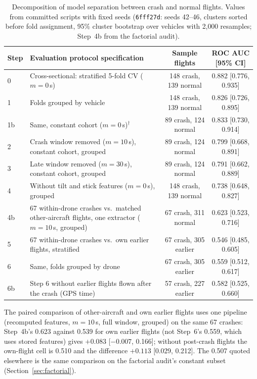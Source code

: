 \documentclass[preprint,12pt]{elsarticle}
\begin{document}
\begin{table}[t]
\centering
\caption{Decomposition of model separation between crash and normal flights. Values from committed scripts with fixed seeds (\texttt{6fff27d}: seeds 42--46, clusters sorted before fold assignment, 95\% cluster bootstrap over vehicles with 2,000 resamples; Step~4b from the factorial audit).}
\label{tab:decomposition}
\small
\begin{tabularx}{\textwidth}{@{}l X c c@{}}
\toprule
Step & Evaluation protocol specification & Sample flights & ROC AUC [95\% CI] \\
\midrule
0 & Cross-sectional: stratified 5-fold CV ($m=0$\,s) & 148 crash, 139 normal & 0.882 [0.776, 0.935] \\
1 & Folds grouped by vehicle & 148 crash, 139 normal & 0.826 [0.726, 0.895] \\
1b & Same, constant cohort ($m=0$\,s)$^\dagger$ & 89 crash, 124 normal & 0.833 [0.730, 0.914] \\
2 & Crash window removed ($m=10$\,s), constant cohort, grouped & 89 crash, 124 normal & 0.799 [0.668, 0.891] \\
3 & Late window removed ($m=30$\,s), constant cohort, grouped & 89 crash, 124 normal & 0.791 [0.662, 0.889] \\
4 & Without tilt and stick features ($m=0$\,s), grouped & 148 crash, 139 normal & 0.738 [0.648, 0.827] \\
4b & 67 within-drone crashes vs.\ matched other-aircraft flights, one extractor ($m=10$\,s, grouped) & 67 crash, 311 normal & 0.623 [0.523, 0.716] \\
5 & 67 within-drone crashes vs.\ own earlier flights, stratified & 67 crash, 305 earlier & 0.546 [0.485, 0.605] \\
6 & Same, folds grouped by drone & 67 crash, 305 earlier & 0.559 [0.512, 0.617] \\
6b & Step 6 without earlier flights flown after the crash (GPS time) & 57 crash, 227 earlier & 0.582 [0.525, 0.660] \\
\bottomrule
\end{tabularx}
\vspace{2pt}
{\footnotesize The paired comparison of other-aircraft and own earlier flights uses one pipeline (recomputed features, $m=10$\,s, full window, grouped) on the same 67 crashes: Step~4b's 0.623 against 0.539 for own earlier flights (not Step~6's 0.559, which uses stored features) gives $+0.083$ [$-0.007$, 0.166]; without post-crash flights the own-flight cell is 0.510 and the difference $+0.113$ [0.029, 0.212]. The 0.507 quoted elsewhere is the same comparison on the factorial audit's constant subset (Section~\ref{sec:factorial}).\par}
\end{table}
\end{document}
